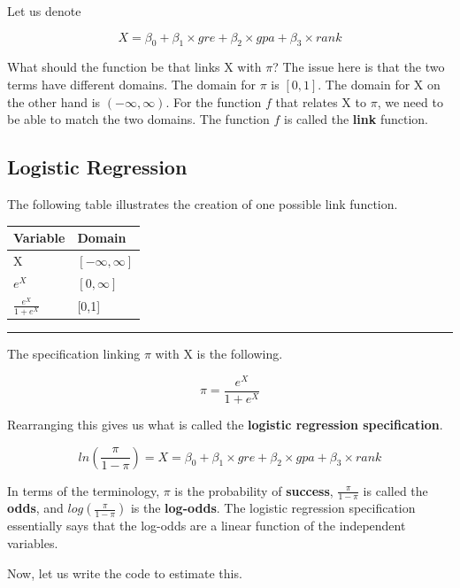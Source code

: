 \documentclass[
]{article}
\begin{document}
Let us denote

\[X = \beta_0 + \beta_1 \times gre + \beta_2 \times gpa + \beta_3 \times rank\]

What should the function be that links X with \(\pi\)? The issue here is
that the two terms have different domains. The domain for \(\pi\) is
\([0,1]\). The domain for X on the other hand is \((-\infty,\infty)\).
For the function \(f\) that relates X to \(\pi\), we need to be able to
match the two domains. The function \(f\) is called the \textbf{link}
function.

\hypertarget{logistic-regression}{%
\subsection{Logistic Regression}\label{logistic-regression}}

The following table illustrates the creation of one possible link
function.

\begin{longtable}[]{@{}ll@{}}
\toprule()
Variable & Domain \\
\midrule()
\endhead
X & \([-\infty,\infty]\) \\
\(e^X\) & \([0,\infty]\) \\
\(\frac{e^X}{1 + e^X}\) & {[}0,1{]} \\
\bottomrule()
\end{longtable}

\begin{center}\rule{0.5\linewidth}{0.5pt}\end{center}

The specification linking \(\pi\) with X is the following.

\[\pi = \frac{e^X}{1 + e^X}\]

Rearranging this gives us what is called the \textbf{logistic regression
specification}.

\[ln(\frac{\pi}{1-\pi}) = X = \beta_0 + \beta_1 \times gre + \beta_2 \times gpa + \beta_3 \times rank\]

In terms of the terminology, \(\pi\) is the probability of
\textbf{success}, \(\frac{\pi}{1-\pi}\) is called the \textbf{odds}, and
\(log(\frac{\pi}{1-\pi})\) is the \textbf{log-odds}. The logistic
regression specification essentially says that the log-odds are a linear
function of the independent variables.

Now, let us write the code to estimate this.
\end{document}
